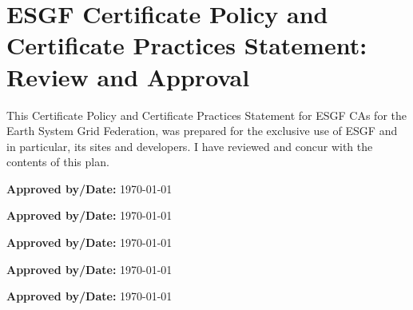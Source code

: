 \section{ESGF Certificate Policy and Certificate Practices Statement: Review and Approval}
This Certificate Policy and Certificate Practices Statement for ESGF CAs for the Earth System Grid Federation, was prepared for the exclusive use of ESGF and in particular, its sites and developers. I have reviewed and concur with the contents of this plan.
\par\vspace{1cm}
\begin{tiny}

\textbf{Approved by/Date:} \underline{\hspace{4cm}}\today\underline{\hspace{4cm}}
\par{}

\textbf{Approved by/Date:} \underline{\hspace{4cm}}\today\underline{\hspace{4cm}}
\par{}

\textbf{Approved by/Date:} \underline{\hspace{4cm}}\today\underline{\hspace{4cm}}
\par{}

\textbf{Approved by/Date:} \underline{\hspace{4cm}}\today\underline{\hspace{4cm}}
\par{}

\textbf{Approved by/Date:} \underline{\hspace{4cm}}\today\underline{\hspace{4cm}}
\par{}


\end{tiny}
